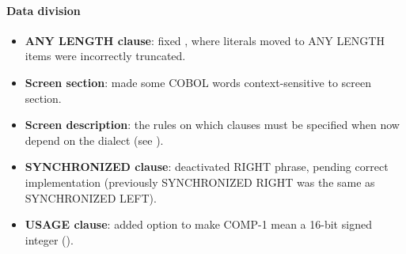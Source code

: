 \paragraph{Data division}
\begin{itemize}
\item \textbf{ANY LENGTH clause}: fixed , where literals moved to ANY LENGTH items were incorrectly truncated.
\item \textbf{Screen section}: made some COBOL words context-sensitive to screen section.
\item \textbf{Screen description}: the rules on which clauses must be specified when now depend on the dialect (see ).
\item \textbf{SYNCHRONIZED clause}: deactivated RIGHT phrase, pending correct implementation (previously SYNCHRONIZED RIGHT was the same as SYNCHRONIZED LEFT).
\item \textbf{USAGE clause}: added option to make COMP-1 mean a 16-bit signed integer ().
\end{itemize}

